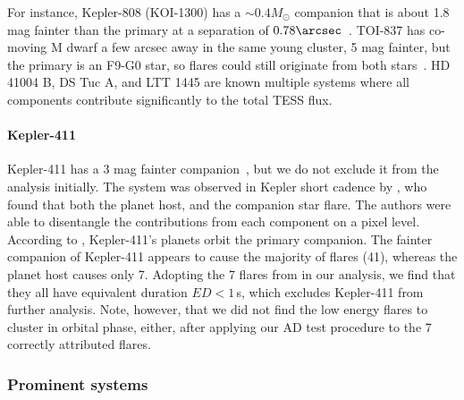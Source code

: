 \documentclass[twocolumn]{aastex631}
\begin{document}
For instance, Kepler-808 (KOI-1300) has a $\sim0.4M_\odot$ \citep{kraus2016impact} companion that is about 1.8 mag fainter than the primary at a separation of $0.78\arcsec$~\citep{baranec2016roboao}. TOI-837 has co-moving M dwarf a few arcsec away in the same young cluster, 5 mag fainter, but the primary is an F9-G0 star, so flares could still originate from both stars~\citep{bouma2020cluster}. HD 41004 B, DS Tuc A, and LTT 1445 are known multiple systems where all components contribute significantly to the total TESS flux.


\paragraph{Kepler-411}
\label{sec:results:individualstars:kep411}
Kepler-411 has a 3 mag fainter companion~\citep{wang2014influence,ziegler2018measuring}, but we do not exclude it from the analysis initially. The system was observed in Kepler short cadence by \citet{jackman2021stellara}, who found that both the planet host, and the companion star flare. The authors were able to disentangle the contributions from each component on a pixel level. According to \citet{morton2016false, sun2019kepler411}, Kepler-411's planets orbit the primary companion. The fainter companion of Kepler-411 appears to cause the majority of flares (41), whereas the planet host causes only 7. Adopting the 7 flares from \cite{jackman2021stellara} in our analysis, we find that they all have equivalent duration $ED<1\,$s, which excludes Kepler-411 from further analysis. Note, however, that we did not find the low energy flares to cluster in orbital phase, either, after applying our AD test procedure to the 7 correctly attributed flares.

\subsubsection{Prominent systems}
\label{sec:prominensystems}
\end{document}
